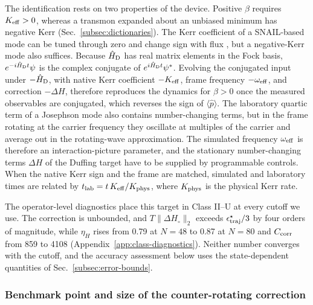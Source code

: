\documentclass[pra,twocolumn,superscriptaddress,nofootinbib,floatfix]{revtex4-2}
\theoremstyle{remark}
\begin{document}
The identification rests on two properties of the device. Positive \(\beta\) requires \(K_{\rm eff}>0\), whereas a transmon expanded about an unbiased minimum has negative Kerr (Sec.~\ref{subsec:dictionaries}). The Kerr coefficient of a SNAIL-based mode can be tuned through zero and change sign with flux \cite{Sivak2019Kerrfree}, but a negative-Kerr mode also suffices. Because \(\hat H_{\rm D}\) has real matrix elements in the Fock basis, \(e^{-i\hat H_{\rm D}t}\psi\) is the complex conjugate of \(e^{i\hat H_{\rm D}t}\psi^*\). Evolving the conjugated input under \(-\hat H_{\rm D}\), with native Kerr coefficient \(-K_{\rm eff}\), frame frequency \(-\omega_{\rm eff}\), and correction \(-\Delta H\), therefore reproduces the dynamics for \(\beta>0\) once the measured observables are conjugated, which reverses the sign of \(\langle\hat p\rangle\). The laboratory quartic term of a Josephson mode also contains number-changing terms, but in the frame rotating at the carrier frequency they oscillate at multiples of the carrier and average out in the rotating-wave approximation. The simulated frequency \(\omega_{\rm eff}\) is therefore an interaction-picture parameter, and the stationary number-changing terms \(\Delta H\) of the Duffing target have to be supplied by programmable controls. When the native Kerr sign and the frame are matched, simulated and laboratory times are related by \(t_{\rm lab}=t\,K_{\rm eff}/K_{\rm phys}\), where \(K_{\rm phys}\) is the physical Kerr rate.

The operator-level diagnostics place this target in Class II--U at every cutoff we use. The correction is unbounded, and \(T\|\Delta H_\circ\|_2\) exceeds \(\epsilon^\star_{\rm traj}/3\) by four orders of magnitude, while \(\eta_H\) rises from 0.79 at \(N=48\) to 0.87 at \(N=80\) and \(C_{\rm corr}\) from 859 to 4108 (Appendix~\ref{app:class-diagnostics}). Neither number converges with the cutoff, and the accuracy assessment below uses the state-dependent quantities of Sec.~\ref{subsec:error-bounds}.

\subsubsection{Benchmark point and size of the counter-rotating correction}
\label{subsec:df-eta}
\end{document}
